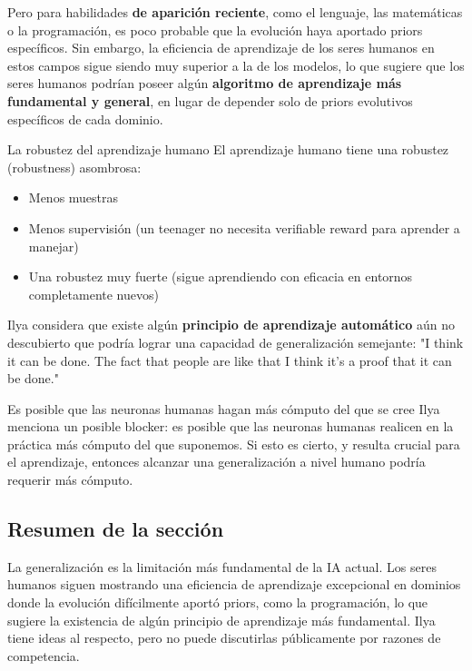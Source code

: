 \documentclass[a4paper]{article}
\begin{document}
Pero para habilidades \textbf{de aparición reciente}, como el lenguaje, las matemáticas o la programación, es poco probable que la evolución haya aportado priors específicos. Sin embargo, la eficiencia de aprendizaje de los seres humanos en estos campos sigue siendo muy superior a la de los modelos, lo que sugiere que los seres humanos podrían poseer algún \textbf{algoritmo de aprendizaje más fundamental y general}, en lugar de depender solo de priors evolutivos específicos de cada dominio.

\begin{importantbox}{La robustez del aprendizaje humano}
El aprendizaje humano tiene una robustez (robustness) asombrosa:
\begin{itemize}
    \item Menos muestras
    \item Menos supervisión (un teenager no necesita verifiable reward para aprender a manejar)
    \item Una robustez muy fuerte (sigue aprendiendo con eficacia en entornos completamente nuevos)
\end{itemize}
Ilya considera que existe algún \textbf{principio de aprendizaje automático} aún no descubierto que podría lograr una capacidad de generalización semejante: "I think it can be done. The fact that people are like that I think it's a proof that it can be done."
\end{importantbox}

\begin{knowledgebox}{Es posible que las neuronas humanas hagan más cómputo del que se cree}
Ilya menciona un posible blocker: es posible que las neuronas humanas realicen en la práctica más cómputo del que suponemos. Si esto es cierto, y resulta crucial para el aprendizaje, entonces alcanzar una generalización a nivel humano podría requerir más cómputo.
\end{knowledgebox}

\subsection{Resumen de la sección}

La generalización es la limitación más fundamental de la IA actual. Los seres humanos siguen mostrando una eficiencia de aprendizaje excepcional en dominios donde la evolución difícilmente aportó priors, como la programación, lo que sugiere la existencia de algún principio de aprendizaje más fundamental. Ilya tiene ideas al respecto, pero no puede discutirlas públicamente por razones de competencia.
\end{document}
